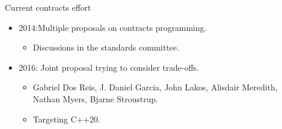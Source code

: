 \begin{frame}[t]{Current contracts effort}
\begin{itemize}
  \item 2014:Multiple proposals on contracts programming.
    \vfill
    \begin{itemize}
      \item Discussions in the standards committee.
    \end{itemize}

  \vfill\pause
  \item 2016: Joint proposal trying to consider trade-offs.
    \begin{itemize}
    \vfill
      \item Gabriel Dos Reis, J. Daniel Garcia, John Lakos, Alisdair Meredith,
Nathan Myers, Bjarne Stroustrup.
    \vfill
      \item Targeting C++20.
    \end{itemize}
\end{itemize}
\end{frame}
